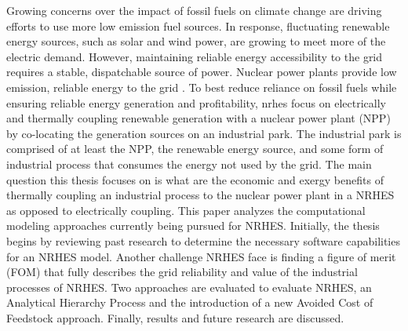 \documentclass[12pt]{UIdahoMastersThesis}
\begin{document}
Growing concerns over the impact of fossil fuels on climate change are driving efforts to use more low emission fuel sources. In response, fluctuating renewable energy sources, such as solar and wind power, are growing to meet more of the electric demand. However, maintaining reliable energy accessibility to the grid requires a stable, dispatchable source of power. Nuclear power plants provide low emission, reliable energy to the grid \cite{IPCC}. To best reduce reliance on fossil fuels while ensuring reliable energy generation and profitability, \ac{nrhes} focus on electrically and thermally coupling renewable generation with a nuclear power plant (NPP) by co-locating the generation sources on an industrial park. The industrial park is comprised of at least the NPP, the renewable energy source, and some form of industrial process that consumes the energy not used by the grid. The main question this thesis focuses on is what are the economic and exergy benefits of thermally coupling an industrial process to the nuclear power plant in a NRHES as opposed to electrically coupling. This paper analyzes the computational modeling approaches currently being pursued for NRHES. Initially, the thesis begins by reviewing past research to determine the necessary software capabilities for an NRHES model. Another challenge NRHES face is finding a figure of merit (FOM) that fully describes the grid reliability and value of the industrial processes of NRHES. Two approaches are evaluated to evaluate NRHES, an Analytical Hierarchy Process and the introduction of a new Avoided Cost of Feedstock approach.  Finally, results and future research are discussed.

\newpage
\end{document}

